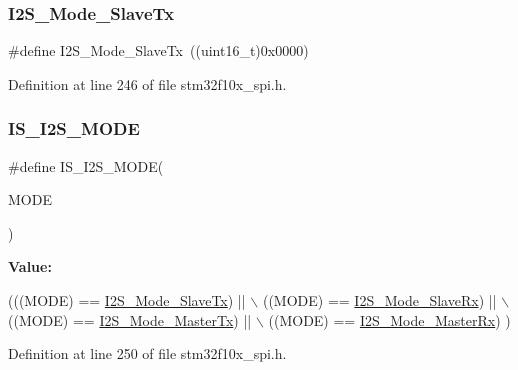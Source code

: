 \subsubsection{\texorpdfstring{I2\+S\+\_\+\+Mode\+\_\+\+Slave\+Tx}{I2S\_Mode\_SlaveTx}}
{\footnotesize\ttfamily \#define I2\+S\+\_\+\+Mode\+\_\+\+Slave\+Tx~((uint16\+\_\+t)0x0000)}



Definition at line 246 of file stm32f10x\+\_\+spi.\+h.

\mbox{\label{group___i2_s___mode_ga942c37b2c1274c4c5773ddcf8b46d9b5}} 
\subsubsection{\texorpdfstring{I\+S\+\_\+\+I2\+S\+\_\+\+M\+O\+DE}{IS\_I2S\_MODE}}
{\footnotesize\ttfamily \#define I\+S\+\_\+\+I2\+S\+\_\+\+M\+O\+DE(\begin{DoxyParamCaption}\item[{}]{M\+O\+DE }\end{DoxyParamCaption})}

{\bfseries Value\+:}
\begin{DoxyCode}
(((MODE) == \hyperlink{group___i2_s___mode_gadd5b20277198fcdb6aa53ea48e802ae5}{I2S\_Mode\_SlaveTx}) || \(\backslash\)
                           ((MODE) == \hyperlink{group___i2_s___mode_gaaf62ee0353476afc9612dc2933e1c5c5}{I2S\_Mode\_SlaveRx}) || \(\backslash\)
                           ((MODE) == \hyperlink{group___i2_s___mode_ga3a62ee8964033a3f6fd030da9e40fba6}{I2S\_Mode\_MasterTx}) || \(\backslash\)
                           ((MODE) == \hyperlink{group___i2_s___mode_gabf9f872cda7c0f159c5fc18aed44e973}{I2S\_Mode\_MasterRx}) )
\end{DoxyCode}


Definition at line 250 of file stm32f10x\+\_\+spi.\+h.

